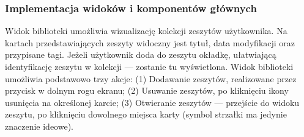 \subsubsection{Implementacja widoków i komponentów głównych}
Widok biblioteki umożliwia wizualizację kolekcji zeszytów użytkownika. Na kartach przedstawiających zeszyty widoczny jest tytuł,
data modyfikacji oraz przypisane tagi. Jeżeli użytkownik doda do zeszytu okładkę, ułatwiającą identyfikację zeszytu w kolekcji — zostanie
tu wyświetlona. Widok biblioteki umożliwia podstawowo trzy akcje: (1) Dodawanie zeszytów, realizowane przez przycisk w dolnym rogu ekranu;
(2) Usuwanie zeszytów, po kliknięciu ikony usunięcia na określonej karcie;
(3) Otwieranie zeszytów — przejście do widoku zeszytu, po kliknięciu dowolnego miejsca karty (symbol strzałki
ma jedynie znaczenie ideowe).
\begin{figure}[H]
	\begin{center}

\end{center}
\end{figure}
